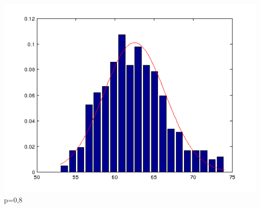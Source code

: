 \documentclass{article}
\begin{document}
\begin{center}
	\includegraphics[scale=0.5]{graph/n50p8.png} \\
	p=0,8
\end{center}
\end{document}
